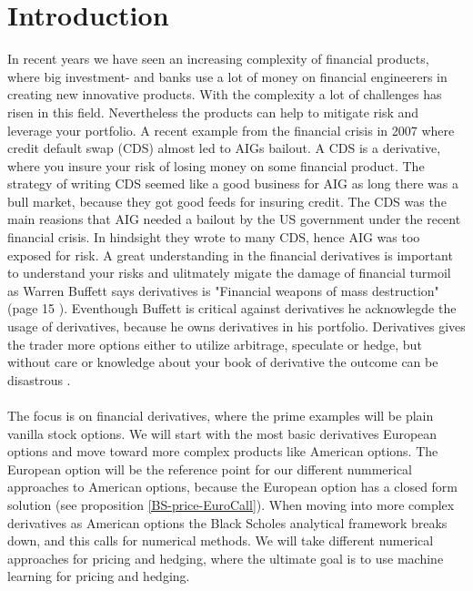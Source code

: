 
\chapter{Introduction} %

\label{Chapter1} %

In recent years we have seen an increasing complexity of financial products, where big investment- and banks use a lot of money on financial engineerers in creating new innovative products. With the complexity a lot of challenges has risen in this field. Nevertheless the products can help to mitigate risk and leverage your portfolio. A recent example from the financial crisis in 2007 where credit default swap (CDS) almost led to AIGs bailout. A CDS is a derivative, where you insure your risk of losing money on some financial product. The strategy of writing CDS seemed like a good business for AIG as long there was a bull market, because they got good feeds for insuring credit. The CDS was the main reasions that AIG needed a bailout by the US government under the recent financial crisis. In hindsight they wrote to many CDS, hence AIG was too exposed for risk. A great understanding in the financial derivatives is important to understand your risks and ulitmately migate the damage of financial turmoil as Warren Buffett says derivatives is "Financial weapons of mass destruction" (page 15 \parencite{Buffett02}). Eventhough Buffett is critical against derivatives he acknowlegde the usage of derivatives, because he owns derivatives in his portfolio. Derivatives gives the trader more options either to utilize arbitrage, speculate or hedge, but without care or knowledge about your book of derivative the outcome can be disastrous  \parencite{Buffett08}.
\\
\\
The focus is on financial derivatives, where the prime examples will be plain vanilla stock options. We will start with the most basic derivatives European options and move toward more complex products like American options. The European option will be the reference point for our different nummerical approaches to American options, because the European option has a closed form solution (see proposition \ref{BS-price-EuroCall}). When moving into more complex derivatives as American options the Black Scholes analytical framework breaks down, and this calls for numerical methods. We will take different numerical approaches for pricing and hedging, where the ultimate goal is to use machine learning for pricing and hedging.
